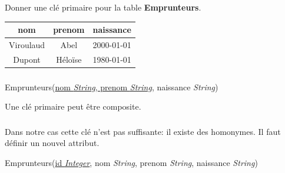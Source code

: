 \documentclass[svgnames,11pt]{beamer}
\begin{document}
\begin{frame}
    \frametitle{}

    \begin{activite}
    Donner une clé primaire pour la table \textbf{Emprunteurs}.
    \end{activite}
    \begin{center}
        \begin{tabular}{|*{3}{c|}}
            \hline
            nom       & prenom  & naissance  \\
            \hline
            Viroulaud & Abel    & 2000-01-01 \\
            Dupont    & Héloïse & 1980-01-01 \\
            \hline
        \end{tabular}
    \end{center}
\end{frame}
\begin{frame}
    \frametitle{}

    Emprunteurs(\underline{nom \emph{String}, prenom \emph{String}}, naissance \emph{String})

    \begin{aretenir}[Remarque]
    Une clé primaire peut être composite. 
    \end{aretenir}
\end{frame}
\begin{frame}
    \frametitle{}

    Dans notre cas cette clé n'est pas suffisante: il existe des homonymes. Il faut définir un nouvel attribut.
    \begin{center}
        Emprunteurs(\underline{id \emph{Integer}}, nom \emph{String}, prenom \emph{String}, naissance \emph{String})
    \end{center}

\end{frame}
\end{document}
